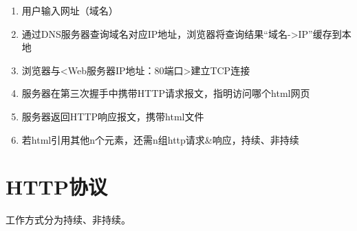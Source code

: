 \begin{enumerate}
    \item 用户输入网址（域名）
    \item 通过DNS服务器查询域名对应IP地址，浏览器将查询结果“域名->IP”缓存到本地
    \item 浏览器与<Web服务器IP地址：80端口>建立TCP连接
    \item 服务器在第三次握手中携带HTTP请求报文，指明访问哪个html网页
    \item 服务器返回HTTP响应报文，携带html文件
    \item 若html引用其他n个元素，还需n组http请求\&响应，持续、非持续
\end{enumerate}


\section{HTTP协议}
工作方式分为持续、非持续。




